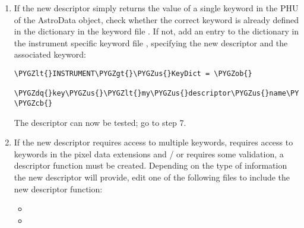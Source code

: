\documentclass[letterpaper,10pt,english]{sphinxmanual}
\def\PYGZus{\char`\_}
\def\PYGZob{\char`\{}
\def\PYGZcb{\char`\}}
\def\PYGZlt{\char`\<}
\def\PYGZgt{\char`\>}
\def\PYGZsh{\char`\#}
\def\PYGZdq{\char`\"}
\begin{document}
\begin{enumerate}
\begin{Verbatim}[commandchars=\\\{\}]
class \PYGZlt{}INSTRUMENT\PYGZgt{}\PYGZus{}DescriptorCalc(GEMINI\PYGZus{}DescriptorCalc):
    \PYGZsh{} Updating the global key dictionary with the local key dictionary
    \PYGZsh{} associated with this descriptor class
    \PYGZus{}update\PYGZus{}stdkey\PYGZus{}dict = \PYGZlt{}INSTRUMENT\PYGZgt{}\PYGZus{}KeyDict
\end{Verbatim}

and an  file:

\begin{Verbatim}[commandchars=\\\{\}]
\PYGZlt{}INSTRUMENT\PYGZgt{}\PYGZus{}KeyDict = \PYGZob{}\PYGZcb{}
\end{Verbatim}

In addition, add an appropriate entry to the 
file.

\item {} 
If the new descriptor simply returns the value of a single keyword in the
PHU of the AstroData object, check whether the correct keyword is already
defined in the  dictionary in the keyword file
. If not, add an entry to the
 dictionary in the instrument specific keyword
file , specifying the new descriptor and the
associated keyword:

\begin{Verbatim}[commandchars=\\\{\}]
\PYGZlt{}INSTRUMENT\PYGZgt{}\PYGZus{}KeyDict = \PYGZob{}
  \PYGZdq{}key\PYGZus{}\PYGZlt{}my\PYGZus{}descriptor\PYGZus{}name\PYGZgt{}\PYGZdq{}:\PYGZdq{}MYKEYWRD\PYGZdq{},
\PYGZcb{}
\end{Verbatim}

The descriptor can now be tested; go to step 7.

\item {} 
If the new descriptor requires access to multiple keywords, requires
access to keywords in the pixel data extensions and / or requires some
validation, a descriptor function must be created. Depending on the type
of information the new descriptor will provide, edit one of the following
files to include the new descriptor function:
\begin{itemize}
\item {} 

\item {} 


\end{itemize}
\end{enumerate}
\end{document}
